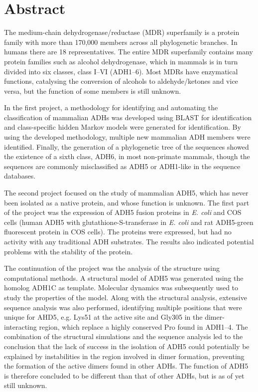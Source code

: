 \documentclass[a4paper, twoside, 12pt, openright]{report}
\begin{document}
  






\chapter*{Abstract}

The medium-chain dehydrogenase/reductase (MDR) superfamily is a protein family with more than 170,000 members across all phylogenetic branches. In humans there are 18 representatives. The entire MDR superfamily contains many protein families such as alcohol dehydrogenase, which in mammals is in turn divided into six classes, class I--VI (ADH1--6). Most MDRs have enzymatical functions, catalysing the conversion of alcohols to aldehyde/ketones and vice versa, but the function of some members is still unknown.

In the first project, a methodology for identifying and automating the classification of mammalian ADHs was developed using BLAST for identification and class-specific hidden Markov models were generated for identification.  By using the developed methodology, multiple new mammalian ADH members were identified. Finally, the generation of a phylogenetic tree of the sequences showed the existence of a sixth class, ADH6, in most non-primate mammals, though the sequences are commonly misclassified as ADH5 or ADH1-like in the sequence databases.

The second project focused on the study of mammalian ADH5, which has never been isolated as a native protein, and whose function is unknown. The first part of the project was the expression of ADH5 fusion proteins in {\em E. coli} and COS cells (human ADH5 with glutathione-S-transferase in {\em E. coli} and rat ADH5-green fluorescent protein in COS cells). The proteins were expressed, but had no activity with any traditional ADH substrates. The results also indicated potential problems with the stability of the protein.

The continuation of the project was the analysis of the structure using computational methods. A structural model of ADH5 was generated using the homolog ADH1C as template. Molecular dynamics was subsequently used to study the properties of the model. Along with the structural analysis, extensive sequence analysis was also performed, identifying multiple positions that were unique for AHD5, e.g. Lys51 at the active site and Gly305 in the dimer-interacting region, which replace a highly conserved Pro found in ADH1--4. The combination of the structural simulations and the sequence analysis led to the conclusion that the lack of success in the isolation of ADH5 could potentially be explained by instabilities in the region involved in dimer formation, preventing the formation of the active dimers found in other ADHs. The function of ADH5 is therefore concluded to be different than that of other ADHs, but is as of yet still unknown.
\end{document}
